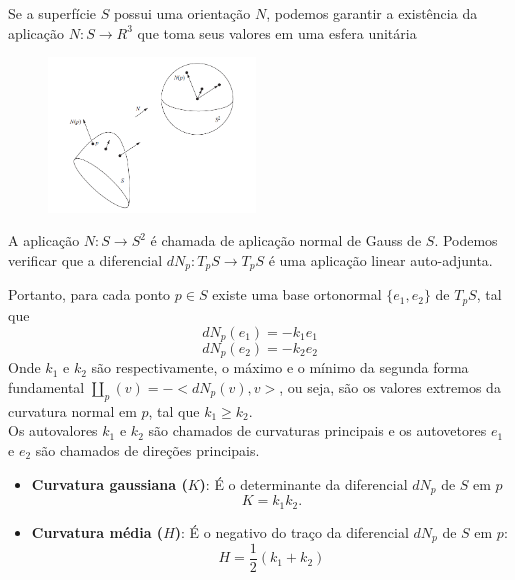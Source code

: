 \documentclass[blue]{beamer}
\begin{document}
\begin{frame}
\justify
\hspace{0.2cm}Se a superfície $S$ possui uma orientação $N$, podemos garantir a existência da aplicação $N: S \rightarrow R^3$ que toma seus valores em uma esfera unitária
\begin{figure}[ht!]
	\centering
	\includegraphics[width=5.5cm]{img4.png}
\end{figure}
\hspace{0.2cm}A aplicação $N: S \rightarrow S^2$ é chamada de aplicação normal de Gauss de $S$. Podemos verificar que a diferencial $dN_p: T_pS \rightarrow T_pS$ é uma aplicação linear auto-adjunta.
\end{frame}

\begin{frame}
\justify
\hspace{0.2cm}Portanto, para cada ponto $p \in S$ existe uma base ortonormal $\{e_1, e_2\}$ de $T_pS$, tal que
$$ dN_p(e_1) = -k_1e_1 $$
$$ dN_p(e_2) = -k_2e_2  $$
\hspace{0.2cm}Onde $k_1$ e $k_2$ são respectivamente, o máximo e o mínimo da segunda forma fundamental $\amalg_p (v) = - < dN_p(v), v>$, ou seja, são os valores extremos da curvatura normal em $p$, tal que $k_1 \geq k_2$. \\
Os autovalores $k_1$ e $k_2$ são chamados de curvaturas principais e os autovetores $e_1$ e $e_2$ são chamados de direções principais.

\end{frame}

\begin{frame}
\justify
\begin{itemize}
	\item \textbf{Curvatura gaussiana ($K$)}: É o determinante da diferencial $dN_p$ de $S$ em $p$
	\begin{equation}
	K=k_1k_2. \nonumber
	\end{equation}
	\item \textbf{Curvatura média ($H$)}: É o negativo do traço da diferencial $dN_p$ de $S$ em $p$:
	\begin{equation}
	H=\frac{1}{2}(k_1+k_2) \nonumber
	\end{equation}
\end{itemize}
\end{frame}
\end{document}
